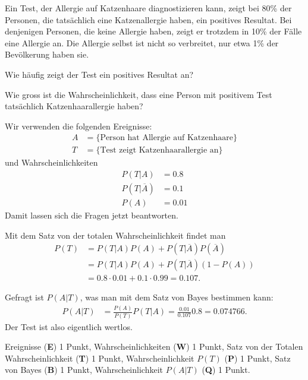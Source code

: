 Ein Test, der Allergie auf Katzenhaare diagnostizieren kann, 
zeigt bei 80\% der Personen, die tatsächlich eine Katzenallergie haben,
ein positives Resultat.
Bei denjenigen Personen, die keine Allergie haben, zeigt er trotzdem
in 10\% der Fälle eine Allergie an.
Die Allergie selbst ist nicht so verbreitet, nur etwa 1\% der Bevölkerung
haben sie.
\begin{teilaufgaben}
\item
Wie häufig zeigt der Test ein positives Resultat an?
\item
Wie gross ist die Wahrscheinlichkeit, dass eine Person mit positivem
Test tatsächlich Katzenhaarallergie haben?
\end{teilaufgaben}

\begin{loesung}
Wir verwenden die folgenden Ereignisse:
\begin{align*}
A&=\{\text{Person hat Allergie auf Katzenhaare}\}
\\
T&=\{\text{Test zeigt Katzenhaarallergie an}\}
\end{align*}
und Wahrscheinlichkeiten
\begin{align*}
P(T|A)&=0.8\\
P(T|\overline{A})&=0.1\\
P(A)&=0.01
\end{align*}
Damit lassen sich die Fragen jetzt beantworten.
\begin{teilaufgaben}
\item
Mit dem Satz von der totalen Wahrscheinlichkeit findet man
\begin{align*}
P(T) 
&=
P(T|A)P(A) + P(T|\overline{A}) P(\overline{A})
\\
&=
P(T|A)P(A) + P(T|\overline{A}) (1-P(A))
\\
&=
0.8\cdot 0.01 + 0.1 \cdot 0.99
= 0.107.
\end{align*}
\item
Gefragt ist $P(A|T)$, was man mit dem 
Satz von Bayes bestimmen kann:
\begin{align*}
P(A|T)
&=
\frac{P(A)}{P(T)}P(T|A)
=
\frac{0.01}{0.107} 0.8
=
0.074766.
\end{align*}
Der Test ist also eigentlich wertlos.
\qedhere
\end{teilaufgaben}
\end{loesung}

\begin{bewertung}
Ereignisse ({\bf E}) 1 Punkt,
Wahrscheinlichkeiten ({\bf W}) 1 Punkt,
Satz von der Totalen Wahrscheinlichkeit ({\bf T}) 1 Punkt,
Wahrscheinlichkeit $P(T)$ ({\bf P}) 1 Punkt,
Satz von Bayes ({\bf B}) 1 Punkt,
Wahrscheinlichkeit $P(A|T)$ ({\bf Q}) 1 Punkt.
\end{bewertung}

